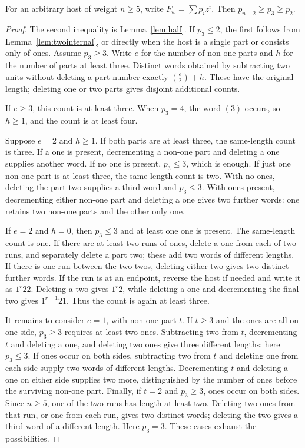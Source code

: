 \begin{lemma}\label{lem:codimtwo}
For an arbitrary host of weight $n\ge5$, write $F_w=\sum p_i z^i$.
Then $p_{n-2}\ge p_3\ge p_2$.
\end{lemma}
\begin{proof}
The second inequality is Lemma~\ref{lem:half}. If $p_3\le2$, the first
follows from Lemma~\ref{lem:twointernal}, or directly when the host is
a single part or consists only of ones. Assume $p_3\ge3$. Write $e$
for the number of non-one parts and $h$ for the number of parts at
least three. Distinct words obtained by subtracting two units without
deleting a part number exactly $\binom e2+h$. These have the original
length; deleting one or two parts gives disjoint additional counts.

If $e\ge3$, this count is at least three. When $p_3=4$, the word $(3)$
occurs, so $h\ge1$, and the count is at least four.

Suppose $e=2$ and $h\ge1$. If both parts are at least three, the
same-length count is three. If a one is present, decrementing a
non-one part and deleting a one supplies another word. If no one is
present, $p_3\le3$, which is enough. If just one non-one part is at
least three, the same-length count is two. With no ones, deleting the
part two supplies a third word and $p_3\le3$. With ones present,
decrementing either non-one part and deleting a one gives two further
words: one retains two non-one parts and the other only one.

If $e=2$ and $h=0$, then $p_3\le3$ and at least one one is present.
The same-length count is one. If there are at least two runs of ones,
delete a one from each of two runs, and separately delete a part two;
these add two words of different lengths. If there is one run between
the two twos, deleting either two gives two distinct further words.
If the run is at an endpoint, reverse the host if needed and write it
as $1^r22$. Deleting a two gives $1^r2$, while deleting a one and
decrementing the final two gives $1^{r-1}21$. Thus the count is again
at least three.

It remains to consider $e=1$, with non-one part $t$.
If $t\ge3$ and the ones are all on one side, $p_3\ge3$ requires at
least two ones. Subtracting two from $t$, decrementing $t$ and deleting
a one, and deleting two ones give three different lengths; here
$p_3\le3$. If ones occur on both sides, subtracting two from $t$ and
deleting one from each side supply two words of different lengths.
Decrementing $t$ and deleting a one on either side supplies two more,
distinguished by the number of ones before the surviving non-one part.
Finally, if $t=2$ and $p_3\ge3$, ones occur on both sides. Since
$n\ge5$, one of the two runs has length at least two. Deleting two
ones from that run, or one from each run, gives two distinct words;
deleting the two gives a third word of a different length. Here
$p_3=3$. These cases exhaust the possibilities.
\end{proof}

